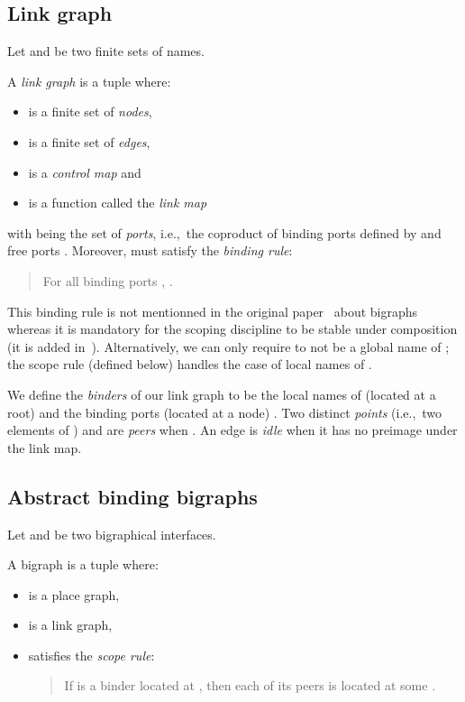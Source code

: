 \documentclass{llncs}
\newcommand{\intro}[1]{\emph{#1}}
\newcommand{\ie}{i.e.,}
\begin{document}
\subsection{Link graph}
Let  and  be two finite sets of names. 
\begin{definition}
    A \intro{link graph}  is a tuple
    where:
    \begin{itemize}
	\item  is a finite set of \emph{nodes},
	\item  is a finite set of \emph{edges},
	\item  is a \emph{control map} and
	\item  is a function called the \emph{link
	    map} 
    \end{itemize}
    with  being the set of \emph{ports}, \ie\ the coproduct of binding ports
    defined by  and free ports . 
    Moreover,  must satisfy the \emph{binding rule}:
    \begin{quote}
	For all binding ports , . 
    \end{quote}
\end{definition}

This binding rule is not mentionned in the original
paper~\cite{Milner:bigraphs} about bigraphs whereas it is mandatory
for the scoping discipline to be stable under composition (it is added
in~\cite{Milner:bigraphs2}). 
Alternatively, we can only require  to not be a global name of ;
the scope rule (defined below) handles the case of local names of . 

We define the \emph{binders} of our link
graph to be the local names of  (located at a root) and the binding
ports (located at a node) .
Two distinct \emph{points} (\ie\, two elements of )  and  are
\emph{peers} when . 
An edge is \emph{idle} when it has no preimage under the link map. 

\subsection{Abstract binding bigraphs}
\label{bigraph:sec:def}
Let  and  be two
bigraphical interfaces. 
\begin{definition}
    A bigraph  is a tuple where: 
    \begin{itemize}
	\item  is a place graph,
	\item  is a link graph, 
	\item  satisfies the \emph{scope rule}:
	    \begin{quote}
		If  is a binder located at , then each of its peers is located at
		some . 
	    \end{quote}
    \end{itemize}
\end{definition}
\end{document}
